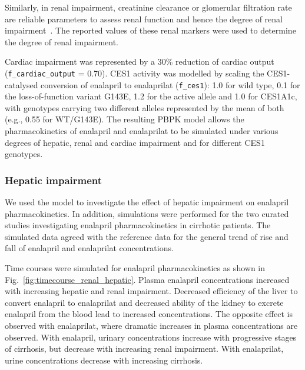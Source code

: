 Similarly, in renal impairment, creatinine clearance or glomerular filtration rate are reliable parameters to assess renal function and hence the degree of renal impairment~\cite{Hockings1986}. The reported values of these renal markers were used to determine the degree of renal impairment.

Cardiac impairment was represented by a 30\% reduction of cardiac output (\texttt{f\_cardiac\_output} = 0.70). CES1 activity was modelled by scaling the CES1-catalysed conversion of enalapril to enalaprilat (\texttt{f\_ces1}): 1.0 for wild type, 0.1 for the loss-of-function variant G143E, 1.2 for the active allele and 1.0 for CES1A1c, with genotypes carrying two different alleles represented by the mean of both (e.g., 0.55 for WT/G143E). The resulting PBPK model allows the pharmacokinetics of enalapril and enalaprilat to be simulated under various degrees of hepatic, renal and cardiac impairment and for different CES1 genotypes.

\subsubsection{Hepatic impairment}
\label{sec:results_hepatic_scans}

We used the model to investigate the effect of hepatic impairment on enalapril pharmacokinetics. In addition, simulations were performed for the two curated studies investigating enalapril pharmacokinetics in cirrhotic patients. The simulated data agreed with the reference data for the general trend of rise and fall of enalapril and enalaprilat concentrations.


Time courses were simulated for enalapril pharmacokinetics as shown in Fig.~\ref{fig:timecourse_renal_hepatic}. Plasma enalapril concentrations increased with increasing hepatic and renal impairment. Decreased efficiency of the liver to convert enalapril to enalaprilat and decreased ability of the kidney to excrete enalapril from the blood lead to increased concentrations. The opposite effect is observed with enalaprilat, where dramatic increases in plasma concentrations are observed. With enalapril, urinary concentrations increase with progressive stages of cirrhosis, but decrease with increasing renal impairment. With enalaprilat, urine concentrations decrease with increasing cirrhosis.    

